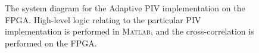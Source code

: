 \documentclass{article}
\begin{document}
\begin{figure}[htbp]
	\caption{The system diagram for the Adaptive PIV implementation on the FPGA. High-level logic relating to the particular PIV implementation is performed in \textsc{Matlab}, and the cross-correlation is performed on the FPGA.}
	\label{fig:system}
\end{figure}



	
	
\end{document}
